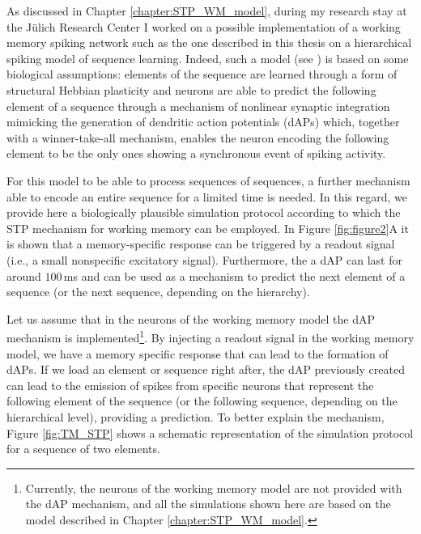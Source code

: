 \documentclass[a4paper, 12pt, twoside, openright]{book}
\begin{document}
As discussed in Chapter \ref{chapter:STP_WM_model}, during my research stay at the Jülich Research Center I worked on a possible implementation of a working memory spiking network such as the one described in this thesis on a hierarchical spiking model of sequence learning. Indeed, such a model (see \cite{Bouhadjar2022}) is based on some biological assumptions: elements of the sequence are learned through a form of structural Hebbian plasticity and neurons are able to predict the following element of a sequence through a mechanism of nonlinear synaptic integration mimicking the generation of dendritic action potentials (dAPs) which, together with a winner-take-all mechanism, enables the neuron encoding the following element to be the only ones showing a synchronous event of spiking activity. 


For this model to be able to process sequences of sequences, a further mechanism able to encode an entire sequence for a limited time is needed. In this regard, we provide here a biologically plausible simulation protocol according to which the STP mechanism for working memory can be employed. In Figure \ref{fig:figure2}A it is shown that a memory-specific response can be triggered by a readout signal (i.e., a small nonspecific excitatory signal). Furthermore, the a dAP can last for around $100$\,ms and can be used as a mechanism to predict the next element of a sequence (or the next sequence, depending on the hierarchy). 


Let us assume that in the neurons of the working memory model the dAP mechanism is implemented\footnote{Currently, the neurons of the working memory model are not provided with the dAP mechanism, and all the simulations shown here are based on the model described in Chapter \ref{chapter:STP_WM_model}.}. By injecting a readout signal in the working memory model, we have a memory specific response that can lead to the formation of dAPs. If we load an element or sequence right after, the dAP previously created can lead to the emission of spikes from specific neurons that represent the following element of the sequence (or the following sequence, depending on the hierarchical level), providing a prediction. To better explain the mechanism, Figure \ref{fig:TM_STP} shows a schematic representation of the simulation protocol for a sequence of two elements.
\end{document}
